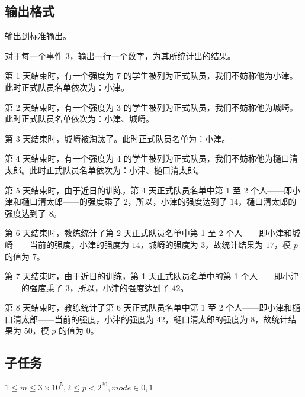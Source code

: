 \subsection*{输出格式}

输出到标准输出。

对于每一个事件 3，输出一行一个数字，为其所统计出的结果。

\examplebox*{}{}

第 1 天结束时，有一个强度为 $7$ 的学生被列为正式队员，我们不妨称他为小津。此时正式队员名单依次为：小津。

第 2 天结束时，有一个强度为 $3$ 的学生被列为正式队员，我们不妨称他为城崎。此时正式队员名单依次为：小津、城崎。

第 3 天结束时，城崎被淘汰了。此时正式队员名单为：小津。

第 4 天结束时，有一个强度为 $4$ 的学生被列为正式队员，我们不妨称他为樋口清太郎。此时正式队员名单依次为：小津、樋口清太郎。

第 5 天结束时，由于近日的训练，第 4 天正式队员名单中第 1 至 2 个人——即小津和樋口清太郎——的强度乘了 2，所以，小津的强度达到了 $14$，樋口清太郎的强度达到了 $8$。

第 6 天结束时，教练统计了第 2 天正式队员名单中第 1 至 2 个人——即小津和城崎——当前的强度，小津的强度为 $14$，城崎的强度为 $3$，故统计结果为 $17$，模 $p$ 的值为 $7$。

第 7 天结束时，由于近日的训练，第 1 天正式队员名单中的第 1 个人——即小津——的强度乘了 3，所以，小津的强度达到了 $42$。

第 8 天结束时，教练统计了第 6 天正式队员名单中第 1 至 2 个人——即小津和樋口清太郎——当前的强度，小津的强度为 $42$，樋口清太郎的强度为 $8$，故统计结果为 $50$，模 $p$ 的值为 $0$。


\subsection*{子任务}

$1 \le m \le 3 \times 10^5, 2 \le p < 2^{30}, mode \in { 0, 1 }$

